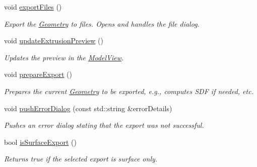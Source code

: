 \begin{DoxyCompactItemize}
\mbox{\label{classpepr3d_1_1_export_assistant_a030d2048fee88d46c3f3db387815f588}} 
void \mbox{\hyperlink{classpepr3d_1_1_export_assistant_a030d2048fee88d46c3f3db387815f588}{export\+Files}} ()
\begin{DoxyCompactList}\small\item\em Export the \mbox{\hyperlink{classpepr3d_1_1_geometry}{Geometry}} to files. Opens and handles the file dialog. \end{DoxyCompactList}\item 
\mbox{\label{classpepr3d_1_1_export_assistant_a9197c8f12e3a88c1c45563d130292017}} 
void \mbox{\hyperlink{classpepr3d_1_1_export_assistant_a9197c8f12e3a88c1c45563d130292017}{update\+Extrusion\+Preview}} ()
\begin{DoxyCompactList}\small\item\em Updates the preview in the \mbox{\hyperlink{classpepr3d_1_1_model_view}{Model\+View}}. \end{DoxyCompactList}\item 
\mbox{\label{classpepr3d_1_1_export_assistant_addcbba7a5c032146a2284f7bc8bc4273}} 
void \mbox{\hyperlink{classpepr3d_1_1_export_assistant_addcbba7a5c032146a2284f7bc8bc4273}{prepare\+Export}} ()
\begin{DoxyCompactList}\small\item\em Prepares the current \mbox{\hyperlink{classpepr3d_1_1_geometry}{Geometry}} to be exported, e.\+g., computes S\+DF if needed, etc. \end{DoxyCompactList}\item 
\mbox{\label{classpepr3d_1_1_export_assistant_a513ed5de202c31f9440bfa86c13a66de}} 
void \mbox{\hyperlink{classpepr3d_1_1_export_assistant_a513ed5de202c31f9440bfa86c13a66de}{push\+Error\+Dialog}} (const std\+::string \&error\+Details)
\begin{DoxyCompactList}\small\item\em Pushes an error dialog stating that the export was not successful. \end{DoxyCompactList}\item 
\mbox{\label{classpepr3d_1_1_export_assistant_ad495ca8829b6dd3a11f40b97fd0adaa9}} 
bool \mbox{\hyperlink{classpepr3d_1_1_export_assistant_ad495ca8829b6dd3a11f40b97fd0adaa9}{is\+Surface\+Export}} ()
\begin{DoxyCompactList}\small\item\em Returns true if the selected export is surface only. \end{DoxyCompactList}\end{DoxyCompactItemize}
